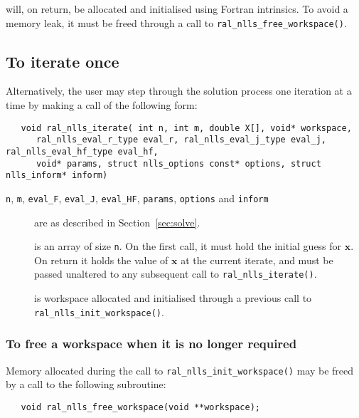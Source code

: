 \documentclass{spec}
\begin{document}
\begin{description}
    will, on return, be allocated and initialised using Fortran intrinsics.
      To avoid a memory leak, it must be freed through a call to \texttt{ral\_nlls\_free\_workspace()}.
\end{description}

\subsection{To iterate once}
\label{sec:iterate}
Alternatively, the user may step through the solution process one iteration at
a time by making a call of the following form:

\begin{verbatim}
   void ral_nlls_iterate( int n, int m, double X[], void* workspace,
      ral_nlls_eval_r_type eval_r, ral_nlls_eval_j_type eval_j, ral_nlls_eval_hf_type eval_hf,
      void* params, struct nlls_options const* options, struct nlls_inform* inform)
\end{verbatim}

\begin{description}

\item[\normalfont \texttt{n}, \texttt{m}, \texttt{eval\_F}, \texttt{eval\_J}, \texttt{eval\_HF}, \texttt{params}, \texttt{options} and \texttt{inform}] are as described in Section~\ref{sec:solve}.

 is an array of size {\tt n}. On the first call, it must hold the initial guess for
$\bm x$. On return it holds the value of $\bm x$ at the current iterate, and
must be passed unaltered to any subsequent call to \texttt{ral\_nlls\_iterate()}.

 is workspace allocated and initialised through a previous call to
\texttt{ral\_nlls\_init\_workspace()}.

\end{description}

\subsubsection{To free a workspace when it is no longer required}

Memory allocated during the call to \texttt{ral\_nlls\_init\_workspace()} may be freed
by a call to the following subroutine:
\begin{verbatim}
   void ral_nlls_free_workspace(void **workspace);
\end{verbatim}
\end{document}
